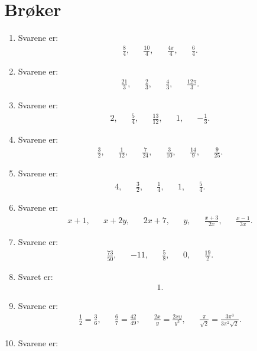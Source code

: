 \section{Brøker}

\begin{enumerate}
\item Svarene er:
\begin{align*}
\frac{8}{4},&& \iffalse \frac{20}{4},&&  \frac{2}{4},&& \fi \frac{10}{4},&& \frac{4 \pi}{4},&& \frac{6}{4}.%
\end{align*}
\item Svarene er:
\begin{align*}
\frac{21}{3},&& \iffalse \frac{9}{3},&&\frac{1}{3},&& \fi \frac{2}{3},&&\frac{4}{3},&&\frac{12\pi}{3 }.%
\end{align*}
\item Svarene er:
\begin{align*}
2,&& \frac{5}{4},&& \frac{13}{12},&&1,&&-\frac{1}{3}.
\end{align*}
\item Svarene er:
\begin{align*}
\frac{3}{2},&&\frac{1}{12},&& \frac{7}{24},&& \frac{3}{10},&& \frac{14}{9},&&\frac{9}{25}.
\end{align*}
\item Svarene er:
\begin{align*}
4,&& \frac{3}{2},&& \frac{1}{4},&& 1,&& \frac{5}{4}.
\end{align*}
\item Svarene er:
\begin{align*}
x+1,&& x+2y,&& 2x+7,&&y,&& \frac{x+3}{2x},&& \frac{x-1}{3x}.
\end{align*}
\item Svarene er:
\begin{align*}
\frac{73}{50},&& -11,&& \frac{5}{8},&& 0,&& \frac{19}{2}.
\end{align*}
\item Svaret er:
\begin{align*}
1.
\end{align*}
\item Svarene er:
\begin{align*}
\frac{1}{2}= \frac{3}{6},&& \frac{6}{7}=\frac{42}{49},&& \frac{2x}{y}=\frac{2xy}{y^2},&& \frac{ \pi}{\sqrt{2}}=\frac{3\pi^3}{3 \pi^2 \sqrt{2}}.
\end{align*}
\item Svarene er:
\begin{align*}

\end{align*}
\end{enumerate}
